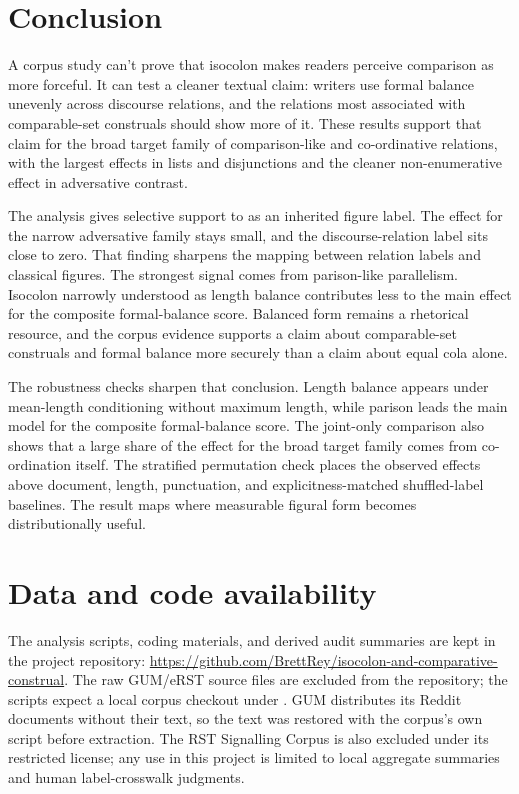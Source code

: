 \documentclass[12pt]{article}
\begin{document}
\section{Conclusion}

A corpus study can't prove that isocolon makes readers perceive
comparison as more forceful. It can test a cleaner textual claim: writers
use formal balance unevenly across discourse relations, and the relations
most associated with comparable-set construals should show more of it.
These results support that claim for the broad target family of
comparison-like and co-ordinative relations, with the largest effects in
lists and disjunctions and the cleaner non-enumerative effect in
adversative contrast.

The analysis gives selective support to  as an inherited
figure label. The effect for the narrow adversative family stays small, and the
discourse-relation label  sits close to
zero. That finding sharpens the mapping between relation labels and
classical figures. The strongest signal comes from parison-like
parallelism. Isocolon narrowly understood as length balance contributes
less to the main effect for the composite formal-balance score. Balanced
form remains a rhetorical resource, and the
corpus evidence supports a claim about comparable-set construals
and formal balance more securely than a claim about equal cola alone.

The robustness checks sharpen that conclusion. Length balance appears
under mean-length conditioning without maximum length, while parison leads
the main model for the composite formal-balance score. The joint-only
comparison also shows that a large share of the effect for the broad target
family comes from co-ordination itself. The stratified permutation check
places the observed effects above document, length, punctuation, and
explicitness-matched shuffled-label baselines. The result maps where
measurable figural form becomes distributionally useful.

\section*{Data and code availability}

The analysis scripts, coding materials, and derived audit summaries are
kept in the project repository:
\url{https://github.com/BrettRey/isocolon-and-comparative-construal}.
The raw GUM/eRST source files are excluded from the repository; the
scripts expect a local corpus checkout under .
GUM distributes its Reddit documents without their text, so the text was
restored with the corpus's own  script before extraction.
The RST Signalling Corpus is also excluded under its restricted license; any
use in this project is limited to local aggregate summaries and human
label-crosswalk judgments.
\end{document}
